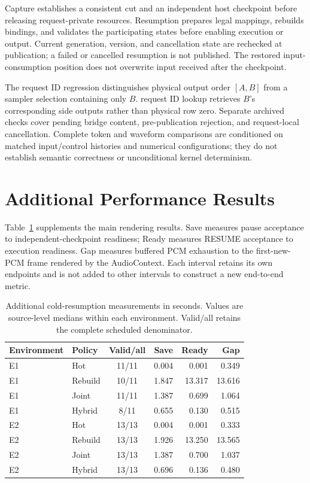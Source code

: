Capture establishes a consistent cut and an independent host
checkpoint before releasing request-private resources.
Resumption prepares legal mappings, rebuilds bindings, and validates
the participating states before enabling execution or output.
Current generation, version, and cancellation state are rechecked
at publication; a failed or cancelled resumption is not published.
The restored input-consumption position does not overwrite input
received after the checkpoint.

The request ID regression distinguishes physical output order
$[A,B]$ from a sampler selection containing only $B$.
request ID lookup retrieves $B$'s corresponding side outputs rather
than physical row zero.
Separate archived checks cover pending bridge content,
pre-publication rejection, and request-local cancellation.
Complete token and waveform comparisons are conditioned on matched
input/control histories and numerical configurations; they do not
establish semantic correctness or unconditional kernel determinism.


\section{Additional Performance Results}
\label{app:performance}

Table~\ref{tab:app_latency} supplements the main rendering results.
Save measures pause acceptance to independent-checkpoint readiness; Ready
measures RESUME acceptance to execution readiness. Gap measures buffered PCM
exhaustion to the first-new-PCM frame rendered by the AudioContext.
Each interval retains its own endpoints and is not added to other
intervals to construct a new end-to-end metric.

\begin{table}[tbp]
    \centering
    \small
    \setlength{\tabcolsep}{6pt}
    \caption{
        Additional cold-resumption measurements in seconds.
        Values are source-level medians within each environment.
        Valid/all retains the complete scheduled denominator.
    }
    \label{tab:app_latency}
    \begin{tabular}{@{}llcrrr@{}}
        \toprule
        Environment & Policy & Valid/all & Save & Ready & Gap \\
        \midrule
        E1 & Hot     & 11/11 & 0.004 & 0.001  & 0.349 \\
        E1 & Rebuild & 10/11 & 1.847 & 13.317 & 13.616 \\
        E1 & Joint   & 11/11 & 1.387 & 0.699  & 1.064 \\
        E1 & Hybrid  & 8/11  & 0.655 & 0.130  & 0.515 \\
        \midrule
        E2 & Hot     & 13/13 & 0.004 & 0.001  & 0.333 \\
        E2 & Rebuild & 13/13 & 1.926 & 13.250 & 13.565 \\
        E2 & Joint   & 13/13 & 1.387 & 0.700  & 1.037 \\
        E2 & Hybrid  & 13/13 & 0.696 & 0.136  & 0.480 \\
        \bottomrule
    \end{tabular}
\end{table}

